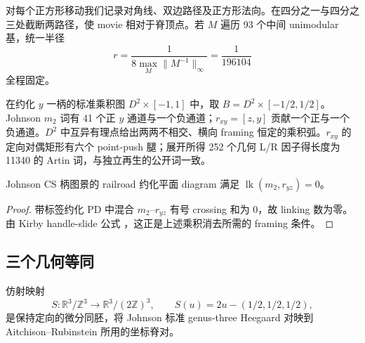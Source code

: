 对每个正方形移动我们记录对角线、双边路径及正方形法向。在四分之一与四分之三处截断两路径，使 movie 相对于脊顶点。若 $M$ 遍历 93 个中间 unimodular 基，统一半径
\[
r=\frac{1}{8\max_M\lVert M^{-1}\rVert_\infty}=\frac1{196104}
\]
全程固定。

在约化 $y$ 一柄的标准乘积图 $D^2\times[-1,1]$ 中，取 $B=D^2\times[-1/2,1/2]$。Johnson $m_2$ 词有 41 个正 $y$ 通道与一个负通道；$r_{xy}=[z,y]$ 贡献一个正与一个负通道。$D^2$ 中互异有理点给出两两不相交、横向 framing 恒定的乘积弧。$r_{xy}$ 的定向对偶矩形有六个 point-push 腿；展开所得 252 个几何 L/R 因子得长度为 11340 的 Artin 词，与独立再生的公开词一致。

\begin{lemma}\label{lem:P0d-link}
Johnson CS 柄图景的 railroad 约化平面 diagram 满足
$\operatorname{lk}(m_2,r_{yz})=0$。
\end{lemma}

\begin{proof}
带标签约化 PD 中混合 $m_2$--$r_{yz}$ 有号 crossing 和为
$0$，故 linking 数为零。由 Kirby handle-slide 公式
\cite{Kirby1978}，这正是上述乘积消去所需的 framing 条件。
\end{proof}

\subsection{三个几何等同}

\begin{lemma}\label{lem:P0a}
仿射映射
\[
S:\mathbb R^3/\mathbb Z^3\longrightarrow
\mathbb R^3/(2\mathbb Z)^3,\qquad
S(u)=2u-(1/2,1/2,1/2),
\]
是保持定向的微分同胚，将 Johnson 标准
genus-three Heegaard 对映到 Aitchison--Rubinstein 所用的坐标脊对。
\end{lemma}

